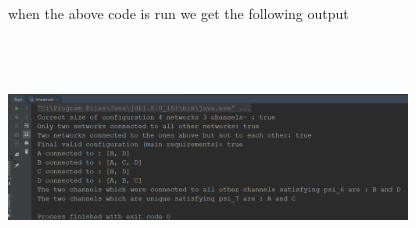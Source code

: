 \documentclass{article}
\begin{document}
\begin{enumerate}[(a)]
\begin{lstlisting}
        \end{lstlisting}
        when the above code is run we get the following output
        \begin{centering}\hspace*{1pt}\\\includegraphics[width=400px, height = 200px]{output3.png}\end{centering}
        

\end{enumerate}
\end{document}
